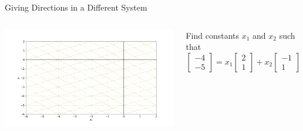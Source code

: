 \documentclass[xcoler=dvipsnames, aspectratio=169]{beamer}
\begin{document}
    \begin{frame}{Giving Directions in a Different System}
        \begin{columns}
            \includegraphics[width=\textwidth]{images/fig-span2.png}
            \begin{example}
                Find constants $x_1$ and $x_2$ such that
                \[
                    \begin{bmatrix}
                        -4\\-5
                    \end{bmatrix} = x_1\begin{bmatrix}
                        2\\1
                    \end{bmatrix} + x_2\begin{bmatrix}
                        -1\\1
                    \end{bmatrix}
                \]
            \end{example}
        \end{columns}
    \end{frame}
\end{document}
